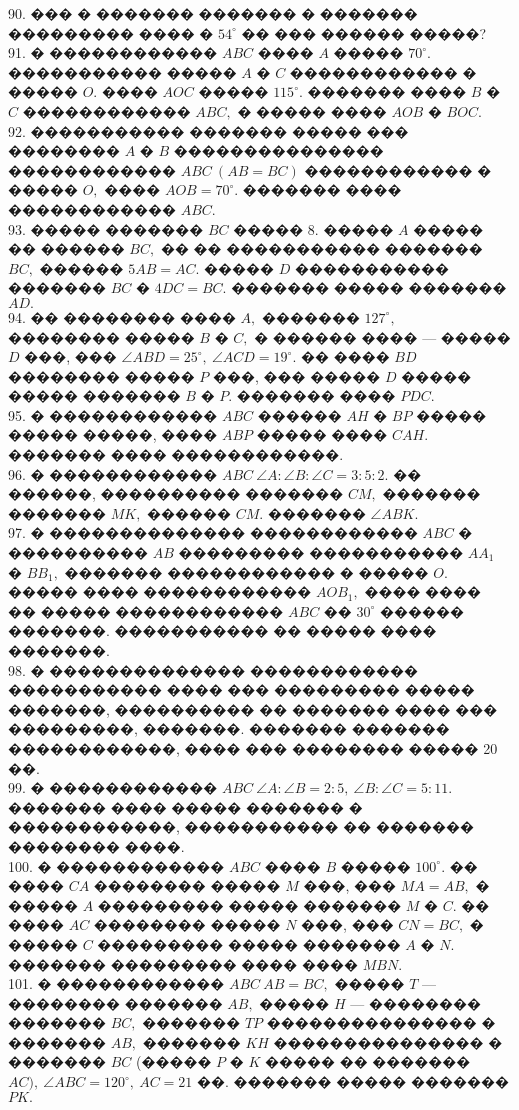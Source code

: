 \documentclass[12pt]{article}
\begin{document}
90. ��� � ������� ������� � ������� ��������� ���� � $54^\circ$ �� ��� ������ �����?\\
91. � ������������ $ABC$ ���� $A$ ����� $70^\circ.$ ����������� ����� $A$ � $C$ ������������ � ����� $O.$ ���� $AOC$ ����� $115^\circ.$ ������� ���� $B$ � $C$ ������������ $ABC,$ � ����� ���� $AOB$ � $BOC.$\\
92. ����������� ������� ����� ��� �������� $A$ � $B$ ��������������� ������������ $ABC\ (AB=BC)$ ������������ � ����� $O,$ ���� $AOB=70^\circ.$ ������� ���� ������������ $ABC.$\\
93. ����� ������� $BC$ ����� 8. ����� $A$ ����� �� ������ $BC,$ �� �� ����������� ������� $BC,$ ������ $5AB=AC.$ ����� $D$ ����������� ������� $BC$ � $4DC=BC.$ ������� ����� ������� $AD.$\\
94. �� �������� ���� $A,$ ������� $127^\circ,$ �������� ����� $B$ � $C,$ � ������ ���� --- ����� $D$ ���, ��� $\angle ABD=25^\circ,\ \angle ACD=19^\circ.$ �� ���� $BD$ �������� ����� $P$ ���, ��� ����� $D$ ����� ����� ������� $B$ � $P.$ ������� ���� $PDC.$\\
95. � ������������ $ABC$ ������ $AH$ � $BP$ ����� ����� �����, ���� $ABP$ ����� ���� $CAH.$ ������� ���� ������������.\\
96. � ������������ $ABC\ \angle A: \angle B: \angle C=3:5:2.$ �� ������, ���������� ������� $CM,$ ������� ������� $MK,$ ������ $CM.$ ������� $\angle ABK.$\\
97. � �������������� ������������ $ABC$ � ���������� $AB$ ��������� ����������� $AA_1$ � $BB_1,$ ������� ������������ � ����� $O.$ ����� ���� ������������ $AOB_1,$ ���� ���� �� ����� ������������ $ABC$ �� $30^\circ$ ������ �������. ����������� �� ����� ���� �������.\\
98. � �������������� ������������ ����������� ���� ��� ��������� ����� �������, ���������� �� ������� ���� ��� ���������, �������. ������� ������� ������������, ���� ��� �������� ����� 20 ��.\\
99. � ������������ $ABC\ \angle A: \angle B=2:5,\ \angle B: \angle C=5:11.$ ������� ���� ����� ������� � ������������, ����������� �� ������� �������� ����.\\
100. � ������������ $ABC$ ���� $B$ ����� $100^\circ.$ �� ���� $CA$ �������� ����� $M$ ���, ��� $MA=AB,$ � ����� $A$ ��������� ����� ������� $M$ � $C.$ �� ���� $AC$ �������� ����� $N$ ���, ��� $CN=BC,$ � ����� $C$ ��������� ����� ������� $A$ � $N.$ ������� ��������� ���� ���� $MBN.$\\
101. � ������������ $ABC\ AB=BC,$ ����� $T$ --- �������� ������� $AB,$ ����� $H$ --- �������� ������� $BC,$ ������� $TP$ ��������������� � ������� $AB,$ ������� $KH$ ��������������� � ������� $BC$ (����� $P$ � $K$ ����� �� ������� $AC),\ \angle ABC=120^\circ,\ AC=21$ ��. ������� ����� ������� $PK.$\\
\end{document}
